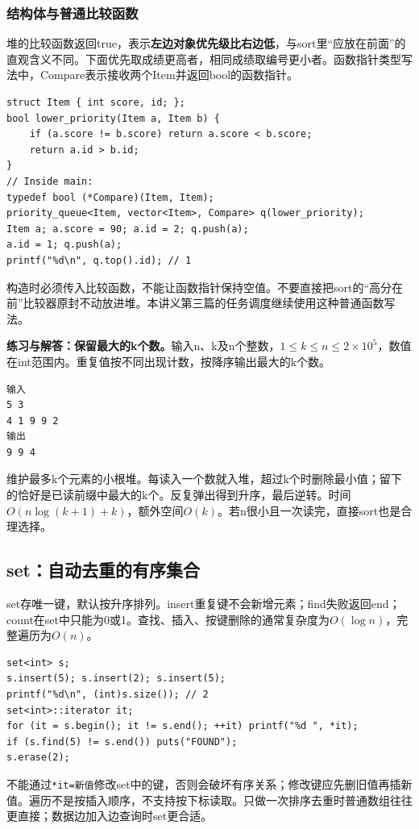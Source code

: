 \subsubsection{结构体与普通比较函数}
堆的比较函数返回true，表示\textbf{左边对象优先级比右边低}，与sort里“应放在前面”的直观含义不同。下面优先取成绩更高者，相同成绩取编号更小者。函数指针类型写法中，Compare表示接收两个Item并返回bool的函数指针。
\begin{lstlisting}
struct Item { int score, id; };
bool lower_priority(Item a, Item b) {
    if (a.score != b.score) return a.score < b.score;
    return a.id > b.id;
}
// Inside main:
typedef bool (*Compare)(Item, Item);
priority_queue<Item, vector<Item>, Compare> q(lower_priority);
Item a; a.score = 90; a.id = 2; q.push(a);
a.id = 1; q.push(a);
printf("%d\n", q.top().id); // 1
\end{lstlisting}
构造时必须传入比较函数，不能让函数指针保持空值。不要直接把sort的“高分在前”比较器原封不动放进堆。本讲义第三篇的任务调度继续使用这种普通函数写法。

\textbf{练习与解答：保留最大的k个数。}输入n、k及n个整数，$1\le k\le n\le2\times10^5$，数值在int范围内。重复值按不同出现计数，按降序输出最大的k个数。
\begin{verbatim}
输入
5 3
4 1 9 9 2
输出
9 9 4
\end{verbatim}

维护最多k个元素的小根堆。每读入一个数就入堆，超过k个时删除最小值；留下的恰好是已读前缀中最大的k个。反复弹出得到升序，最后逆转。时间$O(n\log(k+1)+k)$，额外空间$O(k)$。若n很小且一次读完，直接sort也是合理选择。

\subsection{set：自动去重的有序集合}
set存唯一键，默认按升序排列。insert重复键不会新增元素；find失败返回end；count在set中只能为0或1。查找、插入、按键删除的通常复杂度为$O(\log n)$，完整遍历为$O(n)$。
\begin{lstlisting}
set<int> s;
s.insert(5); s.insert(2); s.insert(5);
printf("%d\n", (int)s.size()); // 2
set<int>::iterator it;
for (it = s.begin(); it != s.end(); ++it) printf("%d ", *it);
if (s.find(5) != s.end()) puts("FOUND");
s.erase(2);
\end{lstlisting}
不能通过\texttt{*it=新值}修改set中的键，否则会破坏有序关系；修改键应先删旧值再插新值。遍历不是按插入顺序，不支持按下标读取。只做一次排序去重时普通数组往往更直接；数据边加入边查询时set更合适。

